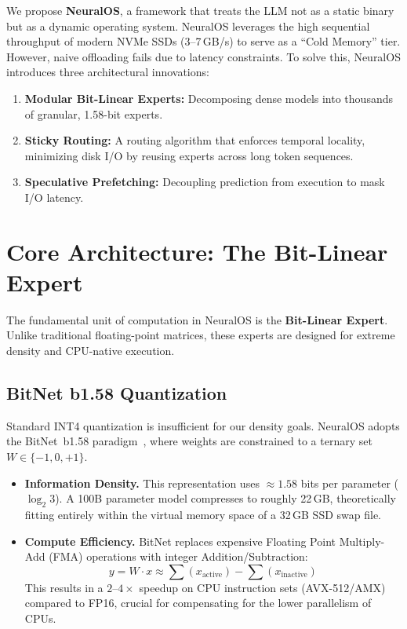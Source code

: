 \documentclass[11pt,twocolumn]{article}
\begin{document}
We propose \textbf{NeuralOS}, a framework that treats the LLM not as a static binary but as a dynamic operating system. NeuralOS leverages the high sequential throughput of modern NVMe SSDs (3--7\,GB/s) to serve as a ``Cold Memory'' tier. However, naive offloading fails due to latency constraints. To solve this, NeuralOS introduces three architectural innovations:

\begin{enumerate}
    \item \textbf{Modular Bit-Linear Experts:} Decomposing dense models into thousands of granular, 1.58-bit experts.
    \item \textbf{Sticky Routing:} A routing algorithm that enforces temporal locality, minimizing disk I/O by reusing experts across long token sequences.
    \item \textbf{Speculative Prefetching:} Decoupling prediction from execution to mask I/O latency.
\end{enumerate}

\section{Core Architecture: The Bit-Linear Expert}

The fundamental unit of computation in NeuralOS is the \textbf{Bit-Linear Expert}. Unlike traditional floating-point matrices, these experts are designed for extreme density and CPU-native execution.

\subsection{BitNet b1.58 Quantization}

Standard INT4 quantization is insufficient for our density goals. NeuralOS adopts the BitNet~b1.58 paradigm~\cite{ma2024era}, where weights are constrained to a ternary set $W \in \{-1, 0, +1\}$.

\begin{itemize}
    \item \textbf{Information Density.} This representation uses ${\approx}1.58$ bits per parameter ($\log_2 3$). A 100B parameter model compresses to roughly 22\,GB, theoretically fitting entirely within the virtual memory space of a 32\,GB SSD swap file.

    \item \textbf{Compute Efficiency.} BitNet replaces expensive Floating Point Multiply-Add (FMA) operations with integer Addition/Subtraction:
    \begin{equation}
        y = W \cdot x \approx \sum(x_{\text{active}}) - \sum(x_{\text{inactive}})
        \label{eq:bitnet-compute}
    \end{equation}
    This results in a $2\text{--}4\times$ speedup on CPU instruction sets (AVX-512/AMX) compared to FP16, crucial for compensating for the lower parallelism of CPUs.
\end{itemize}
\end{document}

